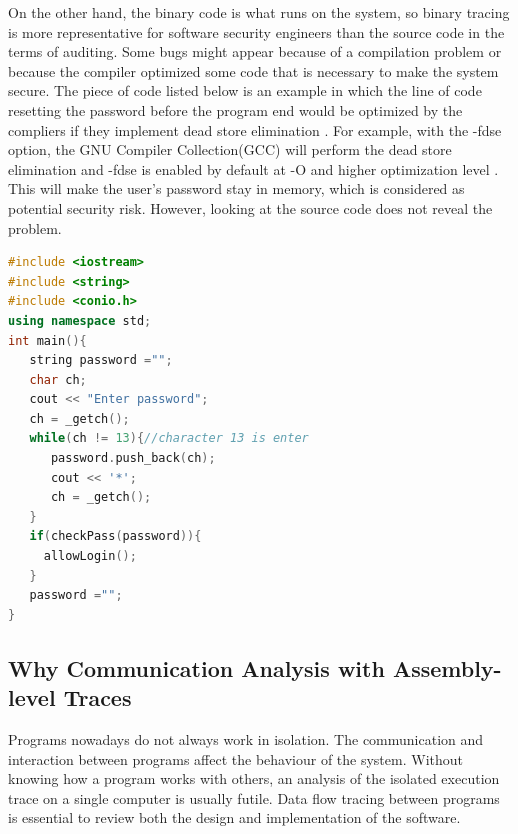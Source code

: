 \documentclass[12pt,oneside]{book}
\providecommand{\DIFaddbegin}{} %
\providecommand{\DIFaddend}{} %
\providecommand{\DIFdelbegin}{} %
\providecommand{\DIFdelend}{} %
\newcommand{\DIFscaledelfig}{0.5}
\newlength{\DIFdelgraphicswidth} %
\newlength{\DIFdelgraphicsheight} %
\newcommand{\DIFaddincludegraphics}[2][]{{\color{blue}\fbox{\DIFOincludegraphics[#1]{#2}}}} %
\newcommand{\DIFdelincludegraphics}[2][]{%
\sbox{\DIFdelgraphicsbox}{\DIFOincludegraphics[#1]{#2}}%
\settoboxwidth{\DIFdelgraphicswidth}{\DIFdelgraphicsbox} %
\settoboxtotalheight{\DIFdelgraphicsheight}{\DIFdelgraphicsbox} %
\scalebox{\DIFscaledelfig}{%
\parbox[b]{\DIFdelgraphicswidth}{\usebox{\DIFdelgraphicsbox}\\[-\baselineskip] \rule{\DIFdelgraphicswidth}{0em}}\llap{\resizebox{\DIFdelgraphicswidth}{\DIFdelgraphicsheight}{%
\setlength{\unitlength}{\DIFdelgraphicswidth}%
\begin{picture}(1,1)%
\thicklines\linethickness{2pt} %
{\color[rgb]{1,0,0}\put(0,0){\framebox(1,1){}}}%
{\color[rgb]{1,0,0}\put(0,0){\line( 1,1){1}}}%
{\color[rgb]{1,0,0}\put(0,1){\line(1,-1){1}}}%
\end{picture}%
}\hspace*{3pt}}} %
} %
\DeclareRobustCommand{\DIFaddbegin}{\DIFOaddbegin \let\includegraphics\DIFaddincludegraphics} %
\DeclareRobustCommand{\DIFaddend}{\DIFOaddend \let\includegraphics\DIFOincludegraphics} %
\DeclareRobustCommand{\DIFdelbegin}{\DIFOdelbegin \let\includegraphics\DIFdelincludegraphics} %
\DeclareRobustCommand{\DIFdelend}{\DIFOaddend \let\includegraphics\DIFOincludegraphics} %
\begin{document}
On the other hand, the binary code is what runs on the system, so binary tracing is more representative for software security engineers than the source code in the terms of auditing. Some bugs might appear because of a compilation problem or because the compiler optimized some code that is necessary to make the system secure. The piece of code listed below is an example in which the line of code resetting the password before the program end would be optimized by the compliers if they implement  dead store elimination \cite{howard2003writing}. For example, with the -fdse option, the GNU Compiler Collection(GCC) will perform the dead store elimination and -fdse is enabled by default at -O and higher optimization level \cite{gcc}. This will make the user's password stay in memory, which is considered as potential security risk. However, looking at the source code does not reveal the problem.

\DIFdelbegin %
\DIFdelend \DIFaddbegin \begin{lstlisting}[language=C++, caption= Password fetching example ]
#include <iostream>
#include <string>
#include <conio.h>
using namespace std;
int main(){
   string password ="";
   char ch;
   cout << "Enter password";
   ch = _getch();
   while(ch != 13){//character 13 is enter
      password.push_back(ch);
      cout << '*';
      ch = _getch();
   }   
   if(checkPass(password)){
     allowLogin();
   }  
   password ="";
}
\end{lstlisting}
\DIFaddend 

\subsection{Why Communication Analysis with Assembly-level Traces}
Programs nowadays do not always work in isolation. The communication and interaction between programs affect the behaviour of the system. Without knowing how a program works with others, an analysis of the isolated execution trace on a single computer is usually futile. Data flow tracing between programs is essential to review both the design and implementation of the software.
\end{document}

